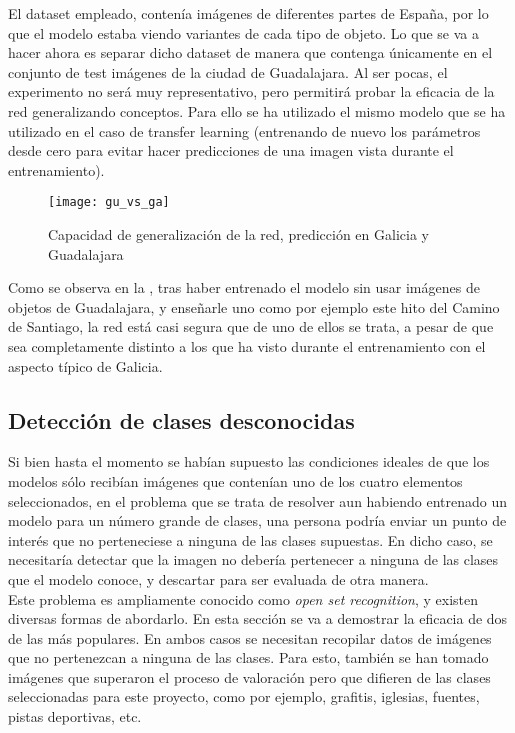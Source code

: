 				El dataset empleado, contenía imágenes de diferentes partes de España, por lo que el modelo estaba viendo variantes de cada tipo de objeto. Lo que se va a hacer ahora es separar dicho dataset de manera que contenga únicamente en el conjunto de test imágenes de la ciudad de Guadalajara. Al ser pocas, el experimento no será muy representativo, pero permitirá probar la eficacia de la red generalizando conceptos. Para ello se ha utilizado el mismo modelo que se ha utilizado en el caso de transfer learning (entrenando de nuevo los parámetros desde cero para evitar hacer predicciones de una imagen vista durante el entrenamiento). \\
				
				\begin{figure}[!h]
					\centering
					\texttt{[image: gu\_vs\_ga]}
					\caption{Capacidad de generalización de la red, predicción en Galicia y Guadalajara}
					\label{fig:comparativa_gu}
				\end{figure}
				
				Como se observa en la , tras haber entrenado el modelo sin usar imágenes de objetos de Guadalajara, y enseñarle uno como por ejemplo este hito del Camino de Santiago, la red está casi segura que de uno de ellos se trata, a pesar de que sea completamente distinto a los que ha visto durante el entrenamiento con el aspecto típico de Galicia. 
				
			\subsection{Detección de clases desconocidas}
			
				Si bien hasta el momento se habían supuesto las condiciones ideales de que los modelos sólo recibían imágenes que contenían uno de los cuatro elementos seleccionados, en el problema que se trata de resolver aun habiendo entrenado un modelo para un número grande de clases, una persona podría enviar un punto de interés que no perteneciese a ninguna de las clases supuestas. En dicho caso, se necesitaría detectar que la imagen no debería pertenecer a ninguna de las clases que el modelo conoce, y descartar para ser evaluada de otra manera. \\
				
				Este problema es ampliamente conocido como \textit{open set recognition}, y existen diversas formas de abordarlo. En esta sección se va a demostrar la eficacia de dos de las más populares. En ambos casos se necesitan recopilar datos de imágenes que no pertenezcan a ninguna de las clases. Para esto, también se han tomado imágenes que superaron el proceso de valoración pero que difieren de las clases seleccionadas para este proyecto, como por ejemplo, grafitis, iglesias, fuentes, pistas deportivas, etc. \\
				
